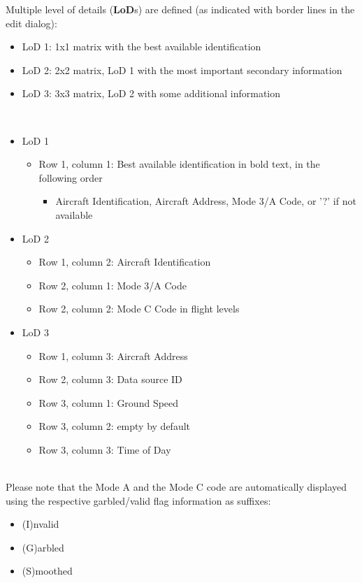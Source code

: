 Multiple level of details (\textbf{LoD}s) are defined (as indicated with border lines in the edit dialog):
\begin{itemize}
 \item LoD 1: 1x1 matrix with the best available identification
 \item LoD 2: 2x2 matrix, LoD 1 with the most important secondary information
 \item LoD 3: 3x3 matrix, LoD 2 with some additional information
\end{itemize} 
\ \\

\begin{itemize}
\item LoD 1
\begin{itemize}
 \item Row 1, column 1: Best available identification in bold text, in the following order
 \begin{itemize}
 \item Aircraft Identification, Aircraft Address, Mode 3/A Code, or '?' if not available
 \end{itemize} 
 \end{itemize} 
\item LoD 2 
 \begin{itemize}
 \item Row 1, column 2: Aircraft Identification
 \item Row 2, column 1: Mode 3/A Code
 \item Row 2, column 2: Mode C Code in flight levels
 \end{itemize} 
\item LoD 3
 \begin{itemize}
 \item Row 1, column 3: Aircraft Address
 \item Row 2, column 3: Data source ID
 \item Row 3, column 1: Ground Speed
 \item Row 3, column 2: empty by default
 \item Row 3, column 3: Time of Day
 \end{itemize} 
\end{itemize} 
\ \\

Please note that the Mode A and the Mode C code are automatically displayed using the respective garbled/valid flag information as suffixes:

\begin{itemize}
 \item (I)nvalid
 \item (G)arbled
 \item (S)moothed
\end{itemize} 

